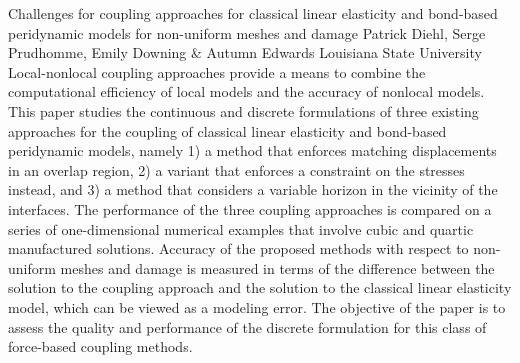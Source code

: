 \begin{addmargin}[2em]{0em}
\vspace{1.5ex}
\abs
{Challenges for coupling approaches for classical linear elasticity and bond-based peridynamic models for non-uniform meshes and damage}
{Patrick Diehl, Serge Prudhomme, Emily Downing \& Autumn Edwards}
{Louisiana State University}
{Local-nonlocal coupling approaches provide a means to combine the computational efficiency of local models and the accuracy of nonlocal models. This paper studies the continuous and discrete formulations of three existing approaches for the coupling of classical linear elasticity and bond-based peridynamic models, namely 1) a method that enforces matching displacements in an overlap region, 2) a variant that enforces a constraint on the stresses instead, and 3) a method that considers a variable horizon in the vicinity of the interfaces. The performance of the three coupling approaches is compared on a series of one-dimensional numerical examples that involve cubic and quartic manufactured solutions. Accuracy of the proposed methods with respect to non-uniform meshes and damage is measured in terms of the difference between the solution to the coupling approach and the solution to the classical linear elasticity model, which can be viewed as a modeling error. The objective of the paper is to assess the quality and performance of the discrete formulation for this class of force-based coupling methods.}
\end{addmargin}
